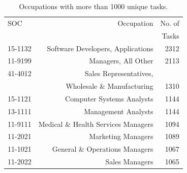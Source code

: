 \documentclass[letterpaper]{article} %
\begin{document}
\begin{table}[h!]
\centering
\scriptsize
\begin{tabular}{l | r | r}
     SOC &  Occupation & No. of  \\
     & & Tasks\\
\hline \hline 
 15-1132 &      Software Developers, Applications   &  2312 \\  [1ex]
 11-9199 &      Managers, All Other   &  2113 \\ [1ex]
 41-4012 &      Sales Representatives,  &  \\
         &       Wholesale \& Manufacturing & 1310 \\ [1ex]
 15-1121 &      Computer Systems Analysts   &  1144 \\ [1ex]
 13-1111 &      Management Analysts   &  1144 \\ [1ex]
 11-9111 &      Medical \& Health Services Managers   &  1094 \\ [1ex]
 11-2021 &      Marketing Managers   &  1089 \\ [1ex]
 11-1021 &      General \& Operations Managers   &  1067 \\ [1ex]
 11-2022 &      Sales Managers   &  1065 \\
\hline
\end{tabular}
\caption{Occupations with more than 1000 unique tasks.
\label{table:soc2task}}
\end{table}
\end{document}
